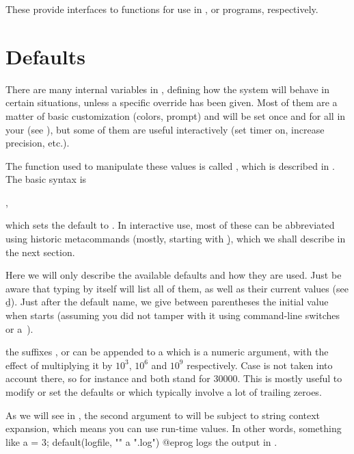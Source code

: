 These provide interfaces to  functions for use in ,
 or  programs,
respectively.

\section{Defaults}
\label{se:defaults}

\noindent There are many internal variables in , defining how the
system will behave in certain situations, unless a specific override has been
given. Most of them are a matter of basic customization (colors, prompt) and
will be set once and for all in your  (see
), but some of them are useful interactively (set timer on,
increase precision, etc.).

The function used to manipulate these values is called , which
is described in . The basic syntax is

,

\noindent which sets the default  to . In interactive
use, most of these can be abbreviated using historic  metacommands
(mostly, starting with \b), which we shall describe in the next section.

Here we will only describe the available defaults and how they are used. Just
be aware that typing  by itself will list all of them, as well
as their current values (see \b{d}). Just after the default name, we give
between parentheses the initial value when  starts (assuming you did
not tamper with it using command-line switches or a~).

 the suffixes ,  or  can be appended to
a  which is a numeric argument, with the effect of multiplying it
by $10^3$, $10^6$ and $10^9$ respectively. Case is not taken into account
there, so for instance  and  both stand for $30000$. This
is mostly useful to modify or set the defaults  or
 which typically involve a lot of trailing zeroes.

 As we will see in ,
the second argument to  will be subject to string context
expansion, which means you can use run-time values. In other words, something
like
\bprog
  a = 3;
  default(logfile, "" a ".log")
@eprog
logs the output in .

